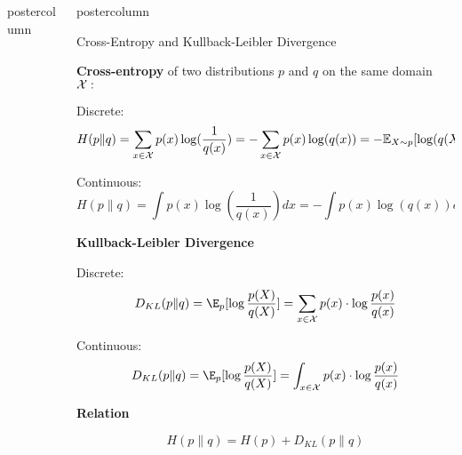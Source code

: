 \documentclass{beamer}
\newlength{\columnheight} %
\begin{document}
\begin{frame}[fragile]{}
\begin{columns}
\begin{column}{.31\textwidth}
\begin{beamercolorbox}[center]{postercolumn}
\begin{minipage}{.98\textwidth}
{							
								
							

}
\end{minipage}
\end{beamercolorbox}
\end{column}


\begin{column}{.31\textwidth}
\begin{beamercolorbox}[center]{postercolumn}
\begin{minipage}{.98\textwidth}
\parbox[t][\columnheight]{\textwidth}{

\begin{myblock}{Cross-Entropy and Kullback-Leibler Divergence}

                  \begin{codebox}
                  \textbf{Cross-entropy} of two distributions $p$ and $q$ on the same domain $\mathcal{X}:$
                  \end{codebox}
                   
								Discrete:
								$$ H(p \| q) = \sum_{x \in \mathcal{X}} p(x) \log(\frac{1}{q(x)}) = - \sum_{x \in \mathcal{X}} p(x) \log(q(x)) = - \mathbb{E}_{X\sim p}[\log(q(X))]$$
								
                Continuous:
                $$ H(p \| q) = \int p(x) \log(\frac{1}{q(x)}) dx = - \int p(x) \log(q(x)) dx = - \mathbb{E}_{X \sim p}[\log(q(X))]$$
                

                \begin{codebox}
                  \textbf{Kullback-Leibler Divergence}
                \end{codebox}
								
                Discrete:
								$$ D_{KL}(p \| q) = \E_p [\log \frac{p(X)}{q(X)}] = \sum_{x \in \Xspace} p(x) \cdot \log \frac{p(x)}{q(x)} $$
								
                Continuous:
                $$ D_{KL}(p \| q) = \E_p [\log \frac{p(X)}{q(X)}] = \int_{x \in \Xspace} p(x) \cdot \log \frac{p(x)}{q(x)} $$
								
								\begin{codebox}
                  \textbf{Relation}
                \end{codebox}
								$$
									H(p \| q) = H(p) + D_{KL}(p \| q)
								$$
								
							\end{myblock}

}
\end{minipage}
\end{beamercolorbox}
\end{column}
\end{columns}
\end{frame}
\end{document}
